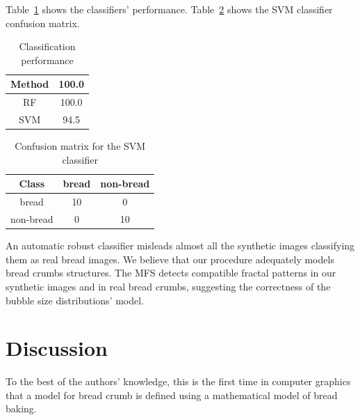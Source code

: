\documentclass[final,5p,times]{elsarticle}
\begin{document}
Table~\ref{Table1} shows the classifiers' performance. Table~\ref{Table2} shows the SVM classifier confusion matrix. 

\begin{table}[htb]
\centering
\begin{tabular}{c|c}
\hline
 Method & 100.0  \\
\hline
 RF & 100.0  \\
SVM  & 94.5 \\
\hline
\end{tabular}
\caption{Classification performance }
\label{Table1}
\end{table}

\begin{table}[htb]
\centering
\begin{tabular}{c|c|c}
\hline
 Class & bread & non-bread  \\
 \hline
bread & 10 & 0  \\
 non-bread & 0 & 10  \\
 \hline
\end{tabular}
\caption{Confusion matrix for the SVM classifier}
\label{Table2}
\end{table}

An automatic robust classifier misleads almost all the synthetic images classifying them as real bread images. We believe that our procedure adequately models bread crumbs structures. The MFS detects compatible fractal patterns in our synthetic images and in real bread crumbs, suggesting the correctness of the bubble size distributions' model.






\section{Discussion}
To the best of the authors' knowledge, this is the first time in computer graphics that a model for bread crumb is defined using a mathematical model of bread baking.
\end{document}
